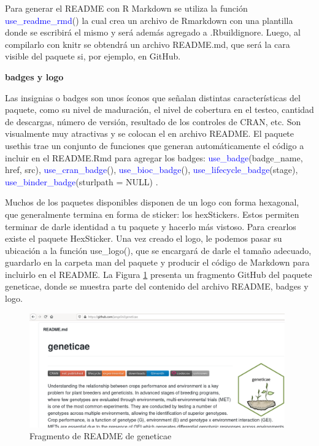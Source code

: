 Para generar el README con R Markdown se utiliza la función \textcolor{blue}{use\_readme\_rmd}() la cual crea un archivo de Rmarkdown con una plantilla donde se escribirá el mismo y será además agregado a .Rbuildignore. Luego, al compilarlo con knitr se obtendrá un archivo README.md, que será la cara visible del paquete si, por ejemplo, en GitHub.

\textbf{badges y logo}

Las insignias o badges son unos íconos que señalan distintas características del paquete, como su nivel de maduración, el nivel de cobertura en el testeo, cantidad de descargas, número de versión, resultado de los controles de CRAN, etc.
Son visualmente muy atractivas y se colocan el en archivo README.     El paquete usethis trae un conjunto de funciones que generan automáticamente el código a incluir en el README.Rmd para agregar los badges: \textcolor{blue}{use\_badge}(badge\_name, href, src), \textcolor{blue}{use\_cran\_badge}(), \textcolor{blue}{use\_bioc\_badge}(), \textcolor{blue}{use\_lifecycle\_badge}(stage), 
\textcolor{blue}{use\_binder\_badge}(sturlpath = NULL) .


Muchos de los paquetes disponibles disponen de un logo con forma hexagonal, que generalmente termina en forma de sticker: los hexStickers. Estos permiten terminar de darle identidad a tu paquete y hacerlo más vistoso. Para crearlos existe el paquete HexSticker. Una vez creado el logo, le podemos pasar su ubicación a la función use\_logo(), que se encargará de darle el tamaño adecuado, guardarlo en la carpeta man del paquete y producir el código de Markdown para incluirlo en el README. 
La Figura \ref{fig:fig36} presenta un fragmento GitHub del paquete geneticae, donde se muestra parte del contenido del archivo README, badges y logo.

\begin{figure}[H]
	\begin{center}
		\includegraphics[width=11cm]{./Graficos/badges.png}	
	\end{center}
	\caption{Fragmento de README de geneticae}
	\label{fig:fig36}
\end{figure}




